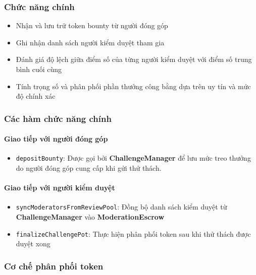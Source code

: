 \subsubsection{Chức năng chính}

\begin{itemize}
  \item Nhận và lưu trữ token bounty từ người đóng góp
  \item Ghi nhận danh sách người kiểm duyệt tham gia
  \item Đánh giá độ lệch giữa điểm số của từng người kiểm duyệt với điểm số trung bình cuối cùng
  \item Tính trọng số và phân phối phần thưởng công bằng dựa trên uy tín và mức độ chính xác
\end{itemize}

\subsubsection{Các hàm chức năng chính}

\paragraph{Giao tiếp với người đóng góp}

\begin{itemize}
  \item \texttt{depositBounty}: Được gọi bởi \textbf{ChallengeManager} để lưu mức treo thưởng do người đóng góp cung cấp khi gửi thử thách.
\end{itemize}

\paragraph{Giao tiếp với người kiểm duyệt}

\begin{itemize}
  \item \texttt{syncModeratorsFromReviewPool}: Đồng bộ danh sách kiểm duyệt từ \textbf{ChallengeManager} vào \textbf{ModerationEscrow}
  \item \texttt{finalizeChallengePot}: Thực hiện phân phối token sau khi thử thách được duyệt xong
\end{itemize}

\subsubsection{Cơ chế phân phối token}

